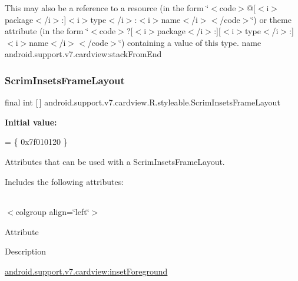 This may also be a reference to a resource (in the form \char`\"{}$<$code$>$@\mbox{[}$<$i$>$package$<$/i$>$\+:\mbox{]}$<$i$>$type$<$/i$>$\+:$<$i$>$name$<$/i$>$$<$/code$>$\char`\"{}) or theme attribute (in the form \char`\"{}$<$code$>$?\mbox{[}$<$i$>$package$<$/i$>$\+:\mbox{]}\mbox{[}$<$i$>$type$<$/i$>$\+:\mbox{]}$<$i$>$name$<$/i$>$$<$/code$>$\char`\"{}) containing a value of this type.  name android.\+support.\+v7.\+cardview\+:stack\+From\+End \mbox{\label{classandroid_1_1support_1_1v7_1_1cardview_1_1R_1_1styleable_a985cd1ba52cab7e08da09a84b07a9d58}} 
\subsubsection{\texorpdfstring{Scrim\+Insets\+Frame\+Layout}{ScrimInsetsFrameLayout}}
{\footnotesize\ttfamily final int \mbox{[}$\,$\mbox{]} android.\+support.\+v7.\+cardview.\+R.\+styleable.\+Scrim\+Insets\+Frame\+Layout\hspace{0.3cm}{\ttfamily [static]}}

{\bfseries Initial value\+:}
\begin{DoxyCode}
= \{
            0x7f010120
        \}
\end{DoxyCode}
Attributes that can be used with a Scrim\+Insets\+Frame\+Layout. 

Includes the following attributes\+:

\tabulinesep=1mm
\begin{longtabu} spread 0pt [c]{*{0}{|X[-1]}|}
\hline
\end{longtabu}
$<$colgroup align=\char`\"{}left\char`\"{}$>$ 

Attribute

Description 

{\ttfamily \hyperlink{classandroid_1_1support_1_1v7_1_1cardview_1_1R_1_1styleable_ab666cfd5d44681b7ad44530a1c3ac75b}{android.\+support.\+v7.\+cardview\+:inset\+Foreground}}

